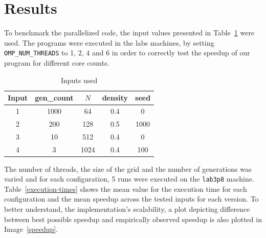 \documentclass{article}
\begin{document}
\section{Results}

To benchmark the parallelized code, the input values presented in Table~\ref{input-values}
were used. The programs were executed in the labs machines, by setting
\texttt{OMP\_NUM\_THREADS} to 1, 2, 4 and 6 in order to correctly test the
speedup of our program for different core counts.


\begin{table}[h!]
	\centering
	\begin{tabular}{||c c c c c||} 
	 \hline
	 Input & gen\_count & $N$ & density & seed  \\ [0.5ex] 
	 \hline\hline
	 1 & 1000 & 64 & 0.4 & 0 \\ 
	 2 & 200 & 128 & 0.5 & 1000 \\
	 3 & 10 & 512 & 0.4 & 0 \\ 
	 4 & 3 & 1024 & 0.4 & 100 \\ [1ex] 
	 \hline
	\end{tabular}
	\caption{Inputs used}
	\label{input-values}
\end{table}

The number of threads, the size of the grid and the number of generations
was varied and for each configuration, 5 runs were executed on the \texttt{lab3p8}
machine. Table~\ref{execution-times} shows the mean value for the execution
time for each configuration and the mean speedup across the tested inputs for
each version. To better understand, the implementation's scalability, a plot
depicting difference between best possible speedup and empirically observed
speedup is also plotted in Image~\ref{speedup}.

\end{document}

